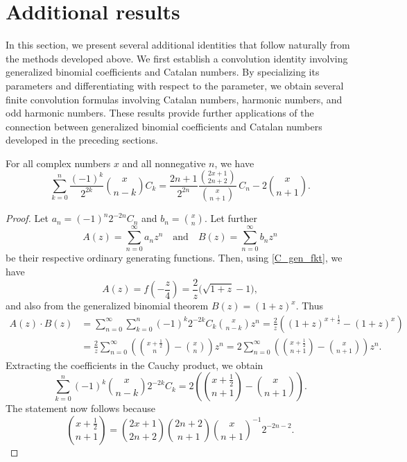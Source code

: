 \documentclass[12pt,reqno]{article}
\begin{document}
\section{Additional results}

In this section, we present several additional identities that follow naturally from the methods developed above. We first establish a convolution identity involving generalized binomial coefficients and Catalan numbers. By specializing its parameters and differentiating with respect to the parameter, we obtain several finite convolution formulas involving Catalan numbers, harmonic numbers, and odd harmonic numbers. These results provide further applications of the connection between generalized binomial coefficients and Catalan numbers developed in the preceding sections.
\begin{lemma}
For all complex numbers $x$ and all nonnegative $n$, we have
\begin{equation}\label{C_bin_id}
\sum_{k=0}^n \frac{(-1)^k}{2^{2k}}\binom{x}{n-k}  C_k = \frac{2n+1}{2^{2n}} \frac{\binom{2x+1}{2n+2}}{\binom{x}{n+1}} \,C_n - 2 \binom{x}{n+1}.
\end{equation}
\end{lemma}
\begin{proof}
	Let $a_n=(-1)^n 2^{-2n}C_n$ and $b_n=\binom{x}{n}$. Let further 
	$$A(z)=\sum_{n=0}^\infty a_n z^n \quad\text{and}\quad B(z)=\sum_{n=0}^\infty b_n z^n$$
	be their respective ordinary generating functions. Then, using \eqref{C_gen_fkt}, we have
	$$A(z) = f\left(-\frac{z}{4}\right ) = \frac{2}{z} \big (\sqrt{1+z}-1 \big ),$$
	and also from the generalized binomial theorem
	$B(z) = (1+z)^x$. Thus
	\begin{align*}
	A(z)\cdot B(z) &= \sum_{n=0}^\infty \sum_{k=0}^n (-1)^k 2^{-2k} C_k \binom{x}{n-k} z^n = \frac{2}{z} \left ((1+z)^{x+\frac12} - (1+z)^x \right ) \\
	&= \frac{2}{z} \sum_{n=0}^\infty \left ( \binom{x+\frac12}{n} - \binom{x}{n} \right ) z^n = 2 \sum_{n=0}^\infty \left ( \binom{x+\frac12}{n+1} - \binom{x}{n+1} \right ) z^n.
	\end{align*}
	Extracting the coefficients in the Cauchy product, we obtain
	\begin{equation*}
	\sum_{k=0}^n (-1)^k  \binom{x}{n-k} 2^{-2k} C_k = 2\left (\binom{x+\frac12}{n+1} - \binom{x}{n+1}\right )\!.
	\end{equation*}
	The statement now follows because
	$$\binom{x+\frac12}{n+1} = \binom{2x+1}{2n+2} \binom{2n+2}{n+1} \binom{x}{n+1}^{-1} 2^{-2n-2}.$$
\end{proof}
\end{document}
